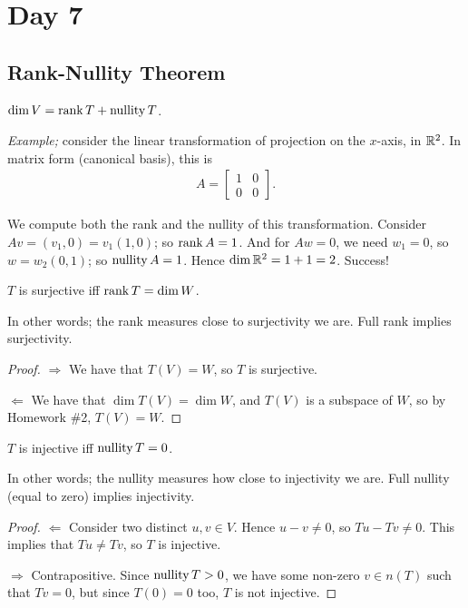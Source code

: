 
\pagebreak
\section{Day 7}

\subsection{Rank-Nullity Theorem}
\begin{theorem}\label{thm:ranknull}
  $\dim V = \operatorname{rank} T + \operatorname{nullity} T$.
\end{theorem}

\emph{Example;} consider the linear transformation of projection on the $x$-axis, in $\mathbb{R}^2$. In matrix form (canonical basis), this is
\begin{align*}
A= \begin{bmatrix}
  1 & 0\\
  0 & 0
\end{bmatrix}.
\end{align*}

We compute both the rank and the nullity of this transformation. Consider $Av=(v_1,0)=v_1(1,0)$; so $\operatorname{rank} A = 1$. And for $Aw=0$, we need $w_1=0$, so $w=w_2(0,1)$; so $\operatorname{nullity} A = 1$. Hence $\dim\mathbb{R}^2=1+1=2$. Success!

\begin{lemma}
  $T$ is surjective iff $\operatorname{rank} T = \dim W$.
\end{lemma}
In other words; the rank measures close to surjectivity we are. Full rank implies surjectivity.
\begin{proof}
  $\Longrightarrow$ We have that $T(V)=W$, so $T$ is surjective.

  $\Longleftarrow$ We have that $\dim T(V)=\dim W$, and $T(V)$ is a subspace of $W$, so by Homework \#2, $T(V)=W$.
\end{proof}

\begin{lemma}
  $T$ is injective iff $\operatorname{nullity} T = 0$.
\end{lemma}
In other words; the nullity measures how close to injectivity we are. Full nullity (equal to zero) implies injectivity.
\begin{proof}
  $\Longleftarrow$ Consider two distinct $u,v\in V$. Hence $u-v\neq 0$, so $Tu-Tv\neq 0$. This implies that $Tu\neq Tv$, so $T$ is injective.

  $\Longrightarrow$ Contrapositive. Since $\operatorname{nullity} T > 0$, we have some non-zero $v\in n(T)$ such that $Tv=0$, but since $T(0)=0$ too, $T$ is not injective.
\end{proof}

